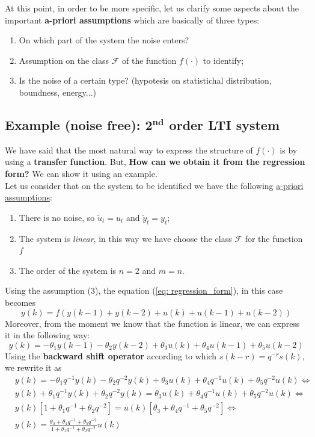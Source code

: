 \noindent
At this point, in order to be more specific, let us clarify some aspects about the important \textbf{a-priori assumptions} which are basically of three types:
\begin{enumerate}
    \itemsep0em
    \item On which part of the system the noise enters?
    \item Assumption on the class $\mathcal{F}$ of the function $f(\cdot)$ to identify; 
    \item Is the noise of a certain type? (hypotesis on statistichal distribution, boundness, energy...)
\end{enumerate}



\subsection{Example (noise free): 2$\mathbf{^{\text{nd}}}$ order LTI system}
We have said that the most natural way to express the structure of $f(\cdot)$ is by using a \textbf{transfer function}.  But, \textbf{How can we obtain it from the regression form?} We can show it using an example.\\
Let us consider that on the system to be identified we have the following \underline{a-priori assumptions}:
\begin{enumerate}
    \item There is no noise, so $\tilde{u}_t=u_t$ and $\tilde{y}_t=y_t$;
    \item The system is \textit{linear}, in this way we have choose the class $\mathcal{F}$ for the function $f$
    \item The order of the system is $n=2$ and $m=n$.
\end{enumerate}
Using the assumption (3), the equation (\ref{eq: regression_form}), in this case becomes
\begin{equation}
    y(k) = f(y(k-1)+y(k-2)+u(k)+u(k-1)+u(k-2))
\end{equation}
Moreover, from the moment we know that the function is linear, we can express it in the following way:
\begin{equation} \label{eq: reg_linear}
    y(k)=-\theta_1y(k-1)-\theta_2y(k-2)+
    \theta_3u(k)+\theta_4u(k-1)+\theta_5u(k-2)
\end{equation}
Using the \textbf{backward shift operator} according to which $s(k-r)=q^{-r}s(k)$, we rewrite it as
\begin{align*}
    &y(k)=-\theta_1 q^{-1} y(k) -\theta_2 q^{-2} y(k) 
    + \theta_3u(k) + \theta_4 q^{-1} u(k) + \theta_5 q^{-2} u(k) \iff \\
    &y(k) +\theta_1 q^{-1} y(k) +\theta_2 q^{-2} y(k) = \theta_3u(k) + \theta_4 q^{-1} u(k) + \theta_5 q^{-2} u(k)
    \iff\\
    &y(k) [1+\theta_1 q^{-1}+\theta_2 q^{-2}] = u(k) [\theta_3+\theta_4q^{-1}+\theta_5q^{-2}] \iff\\
    & y(k) = \frac{\theta_3+\theta_4q^{-1}+\theta_5q^{-2}}{1+\theta_1 q^{-1}+\theta_2 q^{-2}} u(k)
\end{align*}
